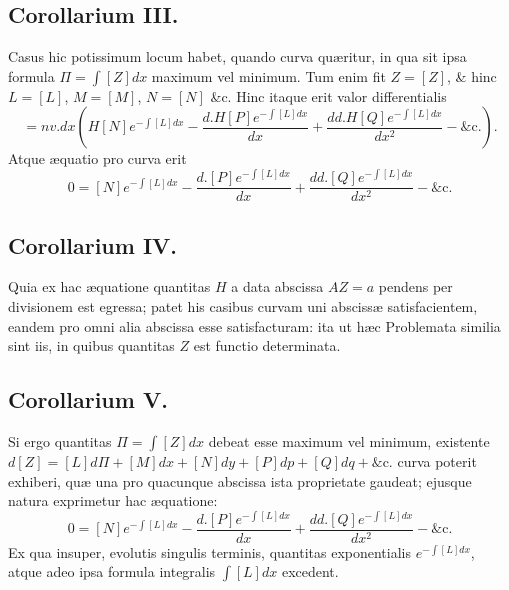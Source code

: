 \subsection*{Corollarium III.}
 Casus hic potissimum locum habet, quando curva quæritur, in qua sit ipsa formula $\Pi=\int[Z]dx$ maximum vel minimum. Tum enim fit $Z=[Z]$, \& hinc $L=[L]$, $M=[M]$, $N=[N]$ \&c. Hinc itaque erit valor differentialis
\[
=nv.dx\left(H[N]e^{-\int[L]dx}-\frac{d.H[P]e^{-\int[L]dx}}{dx}+\frac{dd.H[Q]e^{-\int[L]dx}}{dx^2}-\text{\&c.}\right).
\]
Atque æquatio pro curva erit
\[
0=[N]e^{-\int[L]dx}-\frac{d.[P]e^{-\int[L]dx}}{dx}+\frac{dd.[Q]e^{-\int[L]dx}}{dx^2}-\text{\&c.}
\]
\subsection*{Corollarium IV.}
 Quia ex hac æquatione quantitas $H$ a data abscissa $AZ=a$ pendens per divisionem est egressa; patet his casibus curvam uni abscissæ satisfacientem, eandem pro omni alia abscissa esse satisfacturam: ita ut hæc Problemata similia sint iis, in quibus quantitas $Z$ est functio determinata.
\subsection*{Corollarium V.}
 Si ergo quantitas $\Pi=\int[Z]dx$ debeat esse maximum vel minimum, existente $d[Z]=[L]d\Pi+[M]dx+[N]dy+[P]dp+[Q]dq+\text{\&c.}$ curva poterit exhiberi, quæ una pro quacunque abscissa ista proprietate gaudeat; ejusque natura exprimetur hac æquatione:
\[
0=[N]e^{-\int[L]dx}-\frac{d.[P]e^{-\int[L]dx}}{dx}+\frac{dd.[Q]e^{-\int[L]dx}}{dx^2}-\text{\&c.}
\]
Ex qua insuper, evolutis singulis terminis, quantitas exponentialis $e^{-\int[L]dx}$, atque adeo ipsa formula integralis $\int[L]dx$ excedent.
